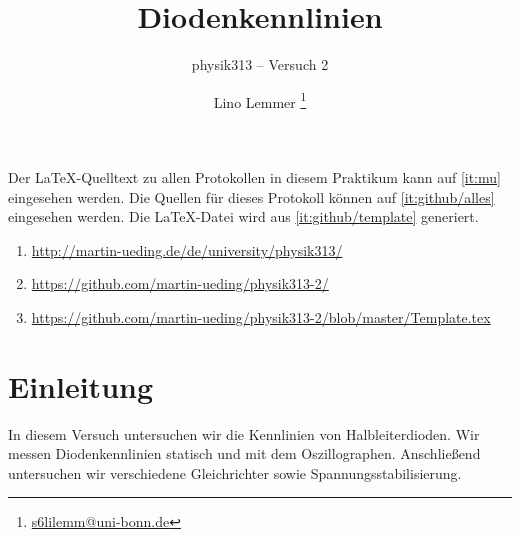 




\subject{Praktikumsprotokoll}
\title{Diodenkennlinien}
\subtitle{physik313 – Versuch 2}
\author{
	Lino Lemmer \footnote{\href{mailto:s6lilemm@uni-bonn.de}{s6lilemm@uni-bonn.de}}
}

\setcounter{tocdepth}{2}



\maketitle

Der \LaTeX-Quelltext zu allen Protokollen in diesem Praktikum kann auf
\ref{it:mu} eingesehen werden. Die Quellen für dieses Protokoll können auf
\ref{it:github/alles} eingesehen werden. Die \LaTeX-Datei wird aus
\ref{it:github/template} generiert.

\begin{enumerate}
	\item
		\label{it:mu}
		\url{http://martin-ueding.de/de/university/physik313/}
	\item
		\label{it:github/alles}
		\url{https://github.com/martin-ueding/physik313-2/}
	\item
		\label{it:github/template}
		\url{https://github.com/martin-ueding/physik313-2/blob/master/Template.tex}
\end{enumerate}

\newpage
\tableofcontents
\newpage


\section{Einleitung}

In diesem Versuch untersuchen wir die Kennlinien von Halbleiterdioden. Wir
messen Diodenkennlinien statisch und mit dem Oszillographen. Anschließend
untersuchen wir verschiedene Gleichrichter sowie Spannungsstabilisierung.


